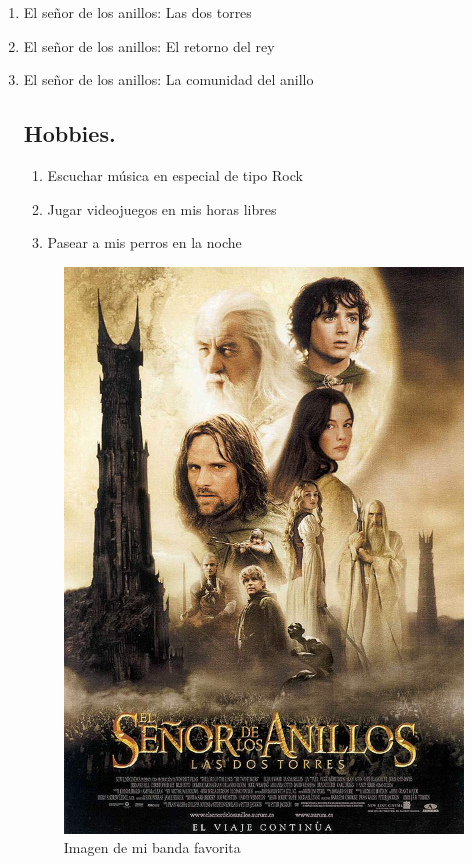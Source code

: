 \begin{enumerate}
\item El señor de los anillos: Las dos torres ~\cite{torres}
\item El señor de los anillos: El retorno del rey ~\cite{retorno}
\item El señor de los anillos: La comunidad del anillo ~\cite{comunidad}
  

\subsection{Hobbies.}
\begin{enumerate}
\item Escuchar música en especial de tipo Rock
\item Jugar videojuegos en mis horas libres
\item Pasear a mis perros en la noche
\end{enumerate}

\begin{figure}[h]
  \centering
  \includegraphics[scale=0.4]{IMG/13.jpg}
  \caption{Imagen de mi banda favorita}
  \label{fig:Soda}
\end{figure}


\end{enumerate}
